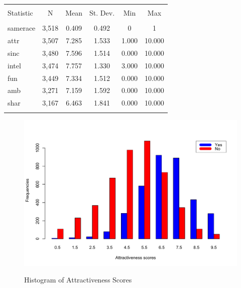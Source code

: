 \documentclass{article}
\begin{document}
\null\\
\begin{table}[!htbp] \centering 
  \caption{} 
  \label{} 
\begin{tabular}{@{\extracolsep{5pt}}lccccc} 
\\[-1.8ex]\hline 
\hline \\[-1.8ex] 
Statistic & \multicolumn{1}{c}{N} & \multicolumn{1}{c}{Mean} & \multicolumn{1}{c}{St. Dev.} & \multicolumn{1}{c}{Min} & \multicolumn{1}{c}{Max} \\ 
\hline \\[-1.8ex] 
samerace & 3,518 & 0.409 & 0.492 & 0 & 1 \\ 
attr & 3,507 & 7.285 & 1.533 & 1.000 & 10.000 \\ 
sinc & 3,480 & 7.596 & 1.514 & 0.000 & 10.000 \\ 
intel & 3,474 & 7.757 & 1.330 & 3.000 & 10.000 \\ 
fun & 3,449 & 7.334 & 1.512 & 0.000 & 10.000 \\ 
amb & 3,271 & 7.159 & 1.592 & 0.000 & 10.000 \\ 
shar & 3,167 & 6.463 & 1.841 & 0.000 & 10.000 \\ 
\hline \\[-1.8ex] 
\end{tabular} 
\end{table} 
%
\begin{figure}[H]
	\caption{Histogram of Attractiveness Scores}
	\includegraphics[scale=0.60]{AttractivenessScores}
	\centering
	\label{fig:attractiveness}
\end{figure}
\end{document}
